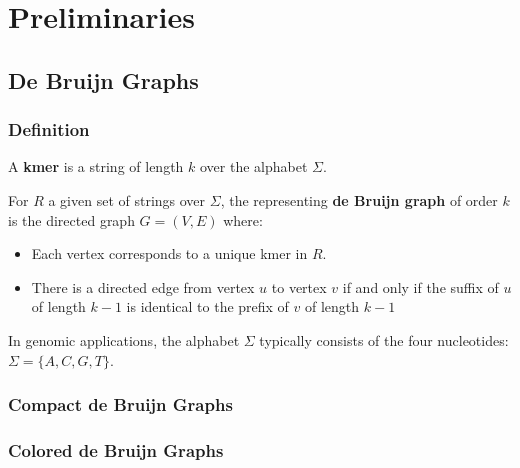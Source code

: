 \chapter{Preliminaries}

\section{De Bruijn Graphs}

\subsection{Definition}

A \textbf{kmer} is a string of length $k$ over the alphabet $\Sigma$.

For $R$ a given set of strings over $\Sigma$, the representing \textbf{de Bruijn graph} of order $k$ is the directed graph $G = (V, E)$ where:
\begin{itemize}
    \item Each vertex corresponds to a unique kmer in $R$.
    \item There is a directed edge from vertex $u$ to vertex $v$ if and only if the suffix of $u$ of length $k-1$ is identical to the prefix of $v$ of length $k-1$
\end{itemize}

In genomic applications, the alphabet $\Sigma$ typically consists of the four nucleotides: $\Sigma = \{A, C, G, T\}$.



\subsection{Compact de Bruijn Graphs}



\subsection{Colored de Bruijn Graphs}




